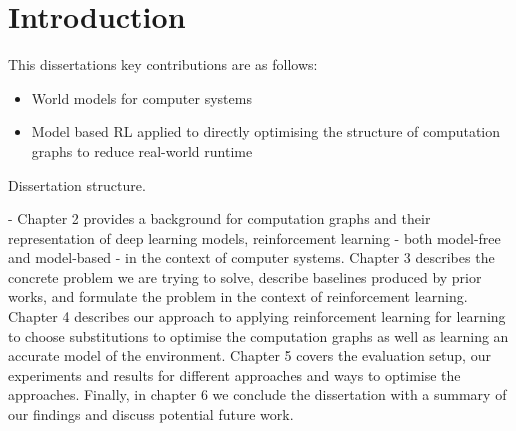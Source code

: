 \chapter{Introduction}

This dissertations key contributions are as follows:

\begin{itemize}
  \item World models for computer systems
  \item Model based RL applied to directly optimising the structure of computation graphs to reduce real-world runtime
\end{itemize}

Dissertation structure.

- Chapter 2 provides a background for computation graphs and their representation of deep learning models, reinforcement learning - both model-free and model-based - in the context of computer systems. Chapter 3 describes the concrete problem we are trying to solve, describe baselines produced by prior works, and formulate the problem in the context of reinforcement learning. Chapter 4 describes our approach to applying reinforcement learning for learning to choose substitutions to optimise the computation graphs as well as learning an accurate model of the environment. Chapter 5 covers the evaluation setup, our experiments and results for different approaches and ways to optimise the approaches. Finally, in chapter 6 we conclude the dissertation with a summary of our findings and discuss potential future work. 